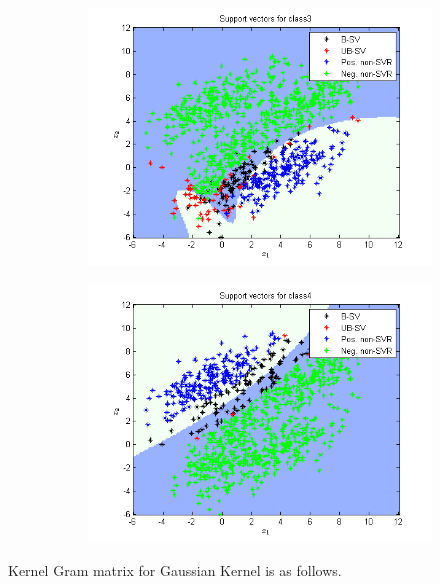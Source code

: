\documentclass{article}
\begin{document}
\begin{figure}
\begin{subfigure}{.5\textwidth}
  \centering
  \includegraphics[width=.8\linewidth]{Classification/1c/nu_g/sv3}
 
\end{subfigure}%
\begin{subfigure}{.5\textwidth}
  \centering
  \includegraphics[width=.8\linewidth]{Classification/1c/nu_g/sv4}
  
\end{subfigure}
\end{figure}
Kernel Gram matrix for Gaussian Kernel is as follows.
\end{document}
